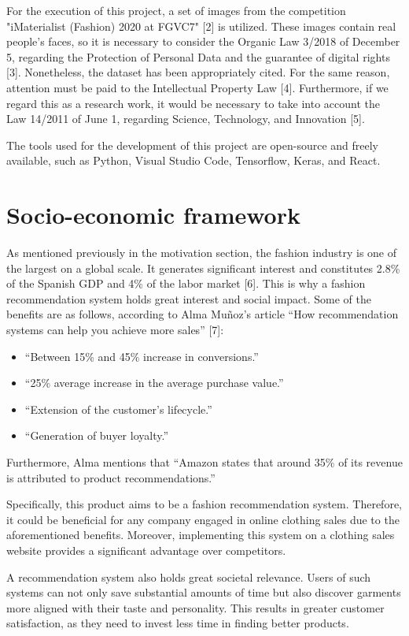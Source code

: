 \documentclass[12pt]{report} %
\begin{document}
For the execution of this project, a set of images from the competition "iMaterialist (Fashion) 2020 at FGVC7" [2] is utilized. These images contain real people's faces, so it is necessary to consider the Organic Law 3/2018 of December 5, regarding the Protection of Personal Data and the guarantee of digital rights [3]. Nonetheless, the dataset has been appropriately cited. For the same reason, attention must be paid to the Intellectual Property Law [4]. Furthermore, if we regard this as a research work, it would be necessary to take into account the Law 14/2011 of June 1, regarding Science, Technology, and Innovation [5].

The tools used for the development of this project are open-source and freely available, such as Python, Visual Studio Code, Tensorflow, Keras, and React.

\section*{Socio-economic framework}

As mentioned previously in the motivation section, the fashion industry is one of the largest on a global scale. It generates significant interest and constitutes 2.8\% of the Spanish GDP and 4\% of the labor market [6]. This is why a fashion recommendation system holds great interest and social impact. Some of the benefits are as follows, according to Alma Muñoz's article ``How recommendation systems can help you achieve more sales'' [7]:
\begin{itemize}
	\item ``Between 15\% and 45\% increase in conversions.''
	\item ``25\% average increase in the average purchase value.''
	\item ``Extension of the customer's lifecycle.''
	\item ``Generation of buyer loyalty.''
\end{itemize}

Furthermore, Alma mentions that ``Amazon states that around 35\% of its revenue is attributed to product recommendations.''

Specifically, this product aims to be a fashion recommendation system. Therefore, it could be beneficial for any company engaged in online clothing sales due to the aforementioned benefits. Moreover, implementing this system on a clothing sales website provides a significant advantage over competitors.

A recommendation system also holds great societal relevance. Users of such systems can not only save substantial amounts of time but also discover garments more aligned with their taste and personality. This results in greater customer satisfaction, as they need to invest less time in finding better products.
\end{document}
